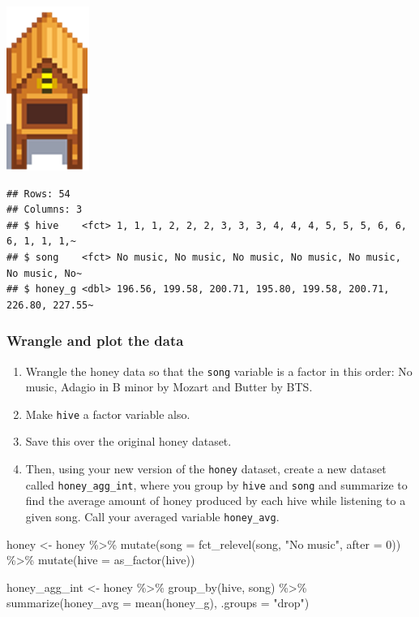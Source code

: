 \documentclass[
  openany]{book}
\newenvironment{Shaded}{\begin{snugshade}}{\end{snugshade}}
\newcommand{\AttributeTok}[1]{\textcolor[rgb]{0.77,0.63,0.00}{#1}}
\newcommand{\DecValTok}[1]{\textcolor[rgb]{0.00,0.00,0.81}{#1}}
\newcommand{\FunctionTok}[1]{\textcolor[rgb]{0.00,0.00,0.00}{#1}}
\newcommand{\NormalTok}[1]{#1}
\newcommand{\OtherTok}[1]{\textcolor[rgb]{0.56,0.35,0.01}{#1}}
\newcommand{\SpecialCharTok}[1]{\textcolor[rgb]{0.00,0.00,0.00}{#1}}
\newcommand{\StringTok}[1]{\textcolor[rgb]{0.31,0.60,0.02}{#1}}
\providecommand{\tightlist}{%
  \setlength{\itemsep}{0pt}\setlength{\parskip}{0pt}}
\begin{document}
\begin{center}\includegraphics[width=0.1\linewidth]{images/m3/hive} \end{center}

\begin{verbatim}
## Rows: 54
## Columns: 3
## $ hive    <fct> 1, 1, 1, 2, 2, 2, 3, 3, 3, 4, 4, 4, 5, 5, 5, 6, 6, 6, 1, 1, 1,~
## $ song    <fct> No music, No music, No music, No music, No music, No music, No~
## $ honey_g <dbl> 196.56, 199.58, 200.71, 195.80, 199.58, 200.71, 226.80, 227.55~
\end{verbatim}

\hypertarget{wrangle-and-plot-the-data}{%
\subsubsection{Wrangle and plot the data}\label{wrangle-and-plot-the-data}}

\begin{enumerate}
\def\labelenumi{\arabic{enumi}.}
\tightlist
\item
  Wrangle the honey data so that the \texttt{song} variable is a factor in this order: No music, Adagio in B minor by Mozart and Butter by BTS.
\item
  Make \texttt{hive} a factor variable also.
\item
  Save this over the original honey dataset.
\item
  Then, using your new version of the \texttt{honey} dataset, create a new dataset called \texttt{honey\_agg\_int}, where you group by \texttt{hive} and \texttt{song} and summarize to find the average amount of honey produced by each hive while listening to a given song. Call your averaged variable \texttt{honey\_avg}.
\end{enumerate}

\begin{Shaded}
\begin{Highlighting}[]
\NormalTok{honey }\OtherTok{\textless{}{-}}\NormalTok{ honey }\SpecialCharTok{\%\textgreater{}\%} 
  \FunctionTok{mutate}\NormalTok{(}\AttributeTok{song =} \FunctionTok{fct\_relevel}\NormalTok{(song, }\StringTok{"No music"}\NormalTok{, }\AttributeTok{after =} \DecValTok{0}\NormalTok{)) }\SpecialCharTok{\%\textgreater{}\%} 
  \FunctionTok{mutate}\NormalTok{(}\AttributeTok{hive =} \FunctionTok{as\_factor}\NormalTok{(hive)) }
  
\NormalTok{honey\_agg\_int }\OtherTok{\textless{}{-}}\NormalTok{ honey }\SpecialCharTok{\%\textgreater{}\%}   
  \FunctionTok{group\_by}\NormalTok{(hive, song) }\SpecialCharTok{\%\textgreater{}\%} 
  \FunctionTok{summarize}\NormalTok{(}\AttributeTok{honey\_avg =} \FunctionTok{mean}\NormalTok{(honey\_g), }\AttributeTok{.groups =} \StringTok{"drop"}\NormalTok{) }
\end{Highlighting}
\end{Shaded}
\end{document}
